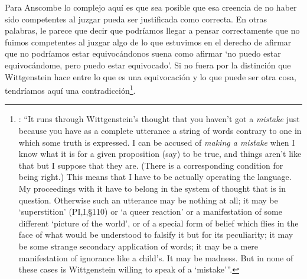 Para Anscombe lo complejo aquí es que sea posible que esa creencia de no haber sido competentes al juzgar pueda ser justificada como correcta. En otras palabras, le parece que decir que podríamos llegar a pensar correctamente que no fuimos competentes al juzgar algo de lo que estuvimos en el derecho de afirmar que no podríamos estar equivocándonos suena como afirmar \enquote*{no puedo estar equivocándome, pero puedo estar equivocado}. Si no fuera por la distinción que Wittgenstein hace entre lo que es una equivocación y lo que puede ser otra cosa, tendríamos aquí una contradicción\footnote{\cite[Cf.][124]{anscombe1981parmenides:qli}: \enquote{It runs through Wittgenstein's thought that you haven't got a \emph{mistake} just because you have as a complete utterance a string of words contrary to one in which some truth is expressed. I can be accused of \emph{making a mistake} when I know what it is for a given proposition (say) to be true, and things aren't like that but I suppose that they are. (There is a corresponding condition for being right.) This means that I have to be actually operating the language. My proceedings with it have to belong in the system of thought that is in question. Otherwise such an utterance may be nothing at all; it may be `superstition' (PI,I,\S110) or `a queer reaction' or a manifestation of some different `picture of the world', or of a special form of belief which flies in the face of what would be understood to falsify it but for its peculiarity; it may be some strange secondary application of words; it may be a mere manifestation of ignorance like a child's. It may be madness. But in none of these cases is Wittgenstein willing to speak of a `mistake'}.}.

